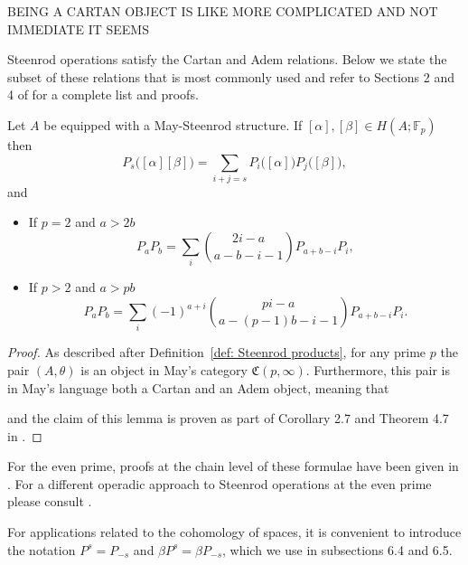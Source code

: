 BEING A CARTAN OBJECT IS LIKE MORE COMPLICATED AND NOT IMMEDIATE IT SEEMS

Steenrod operations satisfy the Cartan and Adem relations.
Below we state the subset of these relations that is most commonly used and refer to Sections 2 and 4 of \cite{may70generalapproach} for a complete list and proofs.
\begin{lemma}
	Let $A$ be equipped with a May-Steenrod structure. If $[\alpha], [\beta] \in H(A;\mathbb{F}_p)$ then
	\begin{equation*}
	P_s\big([\alpha] [\beta]\big) = \sum_{i+j=s} P_i\big( [\alpha] \big) P_j\big( [\beta] \big),
	\end{equation*}
	and
	\begin{itemize}
		\item If $p = 2$ and $a > 2b$
		\begin{equation*}
		P_{a}P_{b} = \sum_i {2i-a \choose a-b-i-1} P_{a+b-i}P_i,
		\end{equation*}
		\item If $p > 2$ and $a > pb$
		\begin{equation*}
		P_{a}P_{b} = \sum_i (-1)^{a+i}{pi-a \choose a-(p-1)b-i-1} P_{a+b-i}P_i.
		\end{equation*}
	\end{itemize}		
\end{lemma}

\begin{proof}
	As described after Definition~\ref{def: Steenrod products}, for any prime $p$ the pair $(A, \theta)$ is an object in May's category $\mathfrak{C}(p, \infty)$.
	Furthermore, this pair is in May's language both a Cartan and an Adem object, meaning that 
	
	and the claim of this lemma is proven as part of Corollary 2.7 and Theorem 4.7 in \cite{may70generalapproach}.
\end{proof}

For the even prime, proofs at the chain level of these formulae have been given in \cite{medina2020cartan,brumfiel2020cochain}. For a different operadic approach to Steenrod operations at the even prime please consult \cite{chataur2005adem-cartan}.

For applications related to the cohomology of spaces, it is convenient to introduce the notation $P^s = P_{-s}$ and $\beta P^s = \beta P_{-s}$, which we use in subsections 6.4 and 6.5.

